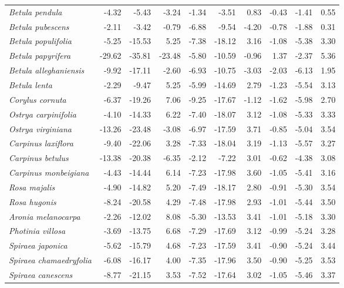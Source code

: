 \documentclass[11pt]{article}
\begin{document}
\begin{longtable}{lrrrrrrrrr}
  \emph{Betula pendula} & -4.32 & -5.43 & -3.24 & -1.34 & -3.51 & 0.83 & -0.43 & -1.41 & 0.55 \\ 
  \emph{Betula pubescens} & -2.11 & -3.42 & -0.79 & -6.88 & -9.54 & -4.20 & -0.78 & -1.88 & 0.31 \\ 
  \emph{Betula populifolia} & -5.25 & -15.53 & 5.25 & -7.38 & -18.12 & 3.16 & -1.08 & -5.38 & 3.30 \\ 
  \emph{Betula papyrifera} & -29.62 & -35.81 & -23.48 & -5.80 & -10.59 & -0.96 & 1.37 & -2.37 & 5.36 \\ 
  \emph{Betula alleghaniensis} & -9.92 & -17.11 & -2.60 & -6.93 & -10.75 & -3.03 & -2.03 & -6.13 & 1.95 \\ 
  \emph{Betula lenta} & -2.29 & -9.47 & 5.25 & -5.99 & -14.69 & 2.79 & -1.23 & -5.54 & 3.13 \\ 
  \emph{Corylus cornuta} & -6.37 & -19.26 & 7.06 & -9.25 & -17.67 & -1.12 & -1.62 & -5.98 & 2.70 \\ 
  \emph{Ostrya carpinifolia} & -4.10 & -14.33 & 6.22 & -7.40 & -18.07 & 3.12 & -1.08 & -5.33 & 3.33 \\ 
  \emph{Ostrya virginiana} & -13.26 & -23.48 & -3.08 & -6.97 & -17.59 & 3.71 & -0.85 & -5.04 & 3.54 \\ 
  \emph{Carpinus laxiflora} & -9.40 & -22.06 & 3.28 & -7.33 & -18.04 & 3.19 & -1.13 & -5.57 & 3.27 \\ 
  \emph{Carpinus betulus} & -13.38 & -20.38 & -6.35 & -2.12 & -7.22 & 3.01 & -0.62 & -4.38 & 3.08 \\ 
  \emph{Carpinus monbeigiana} & -4.43 & -14.44 & 6.14 & -7.23 & -17.98 & 3.60 & -1.05 & -5.41 & 3.16 \\ 
  \emph{Rosa majalis} & -4.90 & -14.82 & 5.20 & -7.49 & -18.17 & 2.80 & -0.91 & -5.30 & 3.54 \\ 
  \emph{Rosa hugonis} & -8.24 & -20.58 & 4.29 & -7.48 & -17.98 & 2.93 & -1.01 & -5.44 & 3.50 \\ 
  \emph{Aronia melanocarpa} & -2.26 & -12.02 & 8.08 & -5.30 & -13.53 & 3.41 & -1.01 & -5.18 & 3.30 \\ 
  \emph{Photinia villosa} & -3.69 & -13.75 & 6.68 & -7.29 & -17.69 & 3.12 & -0.99 & -5.24 & 3.28 \\ 
  \emph{Spiraea japonica} & -5.62 & -15.79 & 4.68 & -7.23 & -17.59 & 3.41 & -0.90 & -5.24 & 3.44 \\ 
  \emph{Spiraea chamaedryfolia} & -6.08 & -16.17 & 4.00 & -7.35 & -17.96 & 3.50 & -0.90 & -5.25 & 3.53 \\ 
  \emph{Spiraea canescens} & -8.77 & -21.15 & 3.53 & -7.52 & -17.64 & 3.02 & -1.05 & -5.46 & 3.37 \\ 

\end{longtable}
\end{document}
